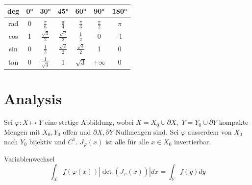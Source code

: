 \documentclass[a4paper,10pt]{article}
\begin{document}
\begin{mainbox}{}
	\begin{center}
		\begin{tabular}{c|cccccc}
			deg & 0° & 30°                  & 45°                  & 60°                  & 90°             & 180°  \\
			\midrule
			rad & 0  & $\frac{\pi}{6}$      & $\frac{\pi}{4}$      & $\frac{\pi}{3}$      & $\frac{\pi}{2}$ & $\pi$ \\
			cos & 1  & $\frac{\sqrt{3}}{2}$ & $\frac{\sqrt{2}}{2}$ & $\frac{1}{2}$        & 0               & -1    \\
			sin & 0  & $\frac{1}{2}$        & $\frac{\sqrt{2}}{2}$ & $\frac{\sqrt{3}}{2}$ & 1               & 0     \\
			tan & 0  & $\frac{1}{\sqrt{3}}$ & 1                    & $\sqrt{3}$           & $+\infty$       & 0     \\
		\end{tabular}
	\end{center}
\end{mainbox}

\section{Analysis}

Sei \(\varphi : X \mapsto Y\) eine stetige Abbildung, wobei \(X=  X_0 \cup \partial X, \) \(Y = Y_0 \cup \partial Y\) kompakte Mengen mit \(X_0, Y_0\) offen und \(\partial X, \partial Y\) Nullmengen sind. Sei $\varphi$ ausserdem von $X_0$ nach $Y_0$ bijektiv und $C^1$. $J_\varphi(x)$ ist alle für alle $x \in X_0$ invertierbar.

\begin{subbox}{Variablenwechsel}
	$$\int_X f(\varphi(x)) | \det(J_\varphi(x)) | dx = \int_Y f(y) dy$$
\end{subbox}
\end{document}
